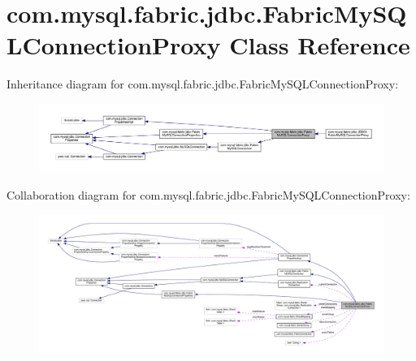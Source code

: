 \hypertarget{classcom_1_1mysql_1_1fabric_1_1jdbc_1_1_fabric_my_s_q_l_connection_proxy}{}\section{com.\+mysql.\+fabric.\+jdbc.\+Fabric\+My\+S\+Q\+L\+Connection\+Proxy Class Reference}
\label{classcom_1_1mysql_1_1fabric_1_1jdbc_1_1_fabric_my_s_q_l_connection_proxy}


Inheritance diagram for com.\+mysql.\+fabric.\+jdbc.\+Fabric\+My\+S\+Q\+L\+Connection\+Proxy\+:\nopagebreak
\begin{figure}[H]
\begin{center}
\leavevmode
\includegraphics[width=350pt]{classcom_1_1mysql_1_1fabric_1_1jdbc_1_1_fabric_my_s_q_l_connection_proxy__inherit__graph}
\end{center}
\end{figure}


Collaboration diagram for com.\+mysql.\+fabric.\+jdbc.\+Fabric\+My\+S\+Q\+L\+Connection\+Proxy\+:\nopagebreak
\begin{figure}[H]
\begin{center}
\leavevmode
\includegraphics[width=350pt]{classcom_1_1mysql_1_1fabric_1_1jdbc_1_1_fabric_my_s_q_l_connection_proxy__coll__graph}
\end{center}
\end{figure}
